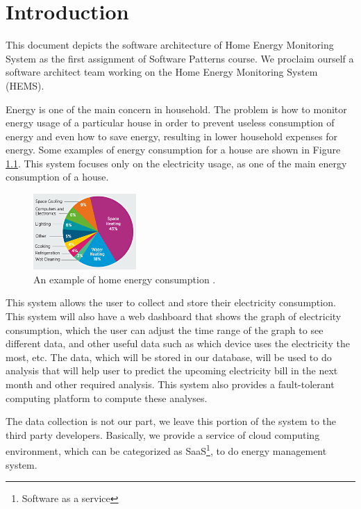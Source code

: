\chapter{Introduction}
\label{ch:context}
This document depicts the software architecture of Home Energy Monitoring System as the first assignment of Software Patterns course. We proclaim ourself a software architect team working on the Home Energy Monitoring System (HEMS).

Energy is one of the main concern in household. The problem is how to monitor energy usage of a particular house in order to prevent useless consumption of energy and even how to save energy, resulting in lower household expenses for energy. Some examples of energy consumption for a house are shown in Figure \ref{fig:home-energy-consumption}. This system focuses only on the electricity usage, as one of the main energy consumption of a house.

\begin{figure}[!ht]
	\centering
	\includegraphics[width=0.35\textwidth]{1-context/images/energysaver_energyuse.png}
	\caption{An example of home energy consumption \cite{greenifynow}.}
	\label{fig:home-energy-consumption}
\end{figure}

This system allows the user to collect and store their electricity consumption. This system will also have a web dashboard that shows the graph of electricity consumption, which the user can adjust the time range of the graph to see different data, and other useful data such as which device uses the electricity the most, etc. The data, which will be stored in our database, will be used to do analysis that will help user to predict the upcoming electricity bill in the next month and other required analysis. This system also provides a fault-tolerant computing platform to compute these analyses.

The data collection is not our part, we leave this portion of the system to the third party developers. Basically, we provide a service of cloud computing environment, which can be categorized as SaaS\footnote{Software as a service}, to do energy management system.

